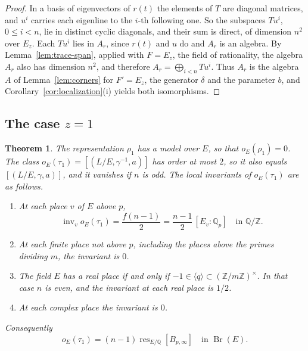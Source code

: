 \documentclass[a4paper,11pt]{amsart}
\newtheorem{theorem}{Theorem}[section]
\theoremstyle{definition}
\theoremstyle{remark}
\numberwithin{equation}{section}
\newcommand{\Q}{\mathbb{Q}}
\newcommand{\Z}{\mathbb{Z}}
\DeclareMathOperator{\Br}{Br}
\DeclareMathOperator{\inv}{inv}
\DeclareMathOperator{\res}{res}
\begin{document}
\begin{proof}
In a basis of eigenvectors of $r(t)$ the elements of $T$ are diagonal matrices, and $u^i$ carries each eigenline to the $i$-th following one. So the subspaces $Tu^i$, $0\leq i<n$, lie in distinct cyclic diagonals, and their sum is direct, of dimension $n^2$ over $E_z$. Each $Tu^i$ lies in $A_r$, since $r(t)$ and $u$ do and $A_r$ is an algebra. By Lemma~\ref{lem:trace-span}, applied with $F=E_z$, the field of rationality, the algebra $A_r$ also has dimension $n^2$, and therefore $A_r=\bigoplus_{i<n}Tu^i$. Thus $A_r$ is the algebra $A$ of Lemma~\ref{lem:corners} for $F'=E_z$, the generator $\delta$ and the parameter $b$, and Corollary~\ref{cor:localization}(i) yields both isomorphisms.
\end{proof}

\subsection{The case \texorpdfstring{$z=1$}{z=1}}\label{subsec:central-value-one}

\begin{theorem}\label{thm:central-value-one}
The representation $\rho_1$ has a model over $E$, so that $o_E(\rho_1)=0$. The class $o_E(\tau_1)=[(L/E,\gamma^{-1},a)]$ has order at most $2$, so it also equals $[(L/E,\gamma,a)]$, and it vanishes if $n$ is odd. The local invariants of $o_E(\tau_1)$ are as follows.
\begin{enumerate}
\item[(i)] At each place $v$ of $E$ above $p$,
\[
 \inv_v o_E(\tau_1)=\frac{f(n-1)}2=\frac{n-1}2\,[E_v:\Q_p]\quad\text{in }\Q/\Z.
\]
\item[(ii)] At each finite place not above $p$, including the places above the primes dividing $m$, the invariant is $0$.
\item[(iii)] The field $E$ has a real place if and only if $-1\in\langle q\rangle\subset(\Z/m\Z)^\times$. In that case $n$ is even, and the invariant at each real place is $1/2$.
\item[(iv)] At each complex place the invariant is $0$.
\end{enumerate}
Consequently
\begin{equation}\label{eq:central-value-one}
 o_E(\tau_1)=(n-1)\res_{E/\Q}[B_{p,\infty}]\quad\text{in }\Br(E).
\end{equation}
\end{theorem}
\end{document}
